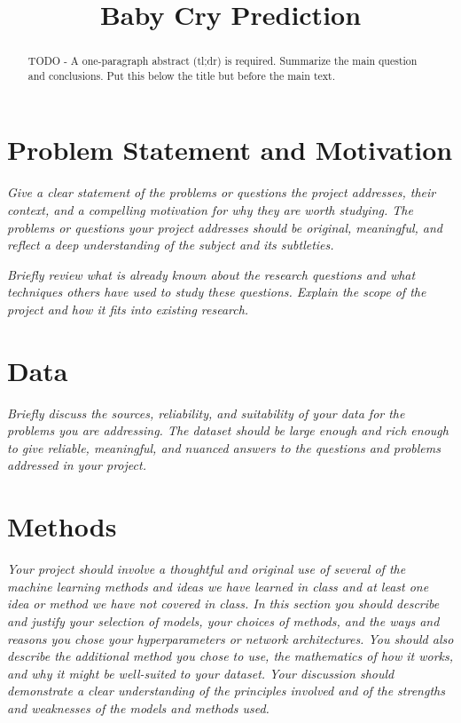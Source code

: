 \documentclass[10pt,letterpaper]{article}
\title{Baby Cry Prediction}
\begin{document}
\maketitle
\begin{abstract}
   TODO - A one-paragraph abstract (tl;dr) is required. Summarize the main question and conclusions. Put this below the title but before the main text.
\end{abstract}

\section{Problem Statement and Motivation}
\textit{Give a clear statement of the problems or questions the project addresses, their context, and a compelling motivation for why they are worth studying. The problems or questions your project addresses should be original, meaningful, and reflect a deep understanding of the subject and its subtleties.}

\textit{Briefly review what is already known about the research questions and what techniques others have used to study these questions. Explain the scope of the project and how it fits into existing research.}


\section{Data}
\textit{Briefly discuss the sources, reliability, and suitability of your data for the problems you are addressing. The dataset should be large enough and rich enough to give reliable, meaningful, and nuanced answers to the questions and problems addressed in your project.}

\section{Methods}
\textit{Your project should involve a thoughtful and original use of several of the machine learning methods and ideas we have learned in class and at least one idea or method we have not covered in class. In this section you should describe and justify your selection of models, your choices of methods, and the ways and reasons you chose your hyperparameters or network architectures. You should also describe the additional method you chose to use, the mathematics of how it works, and why it might be well-suited to your dataset. Your discussion should demonstrate a clear understanding of the principles involved and of the strengths and weaknesses of the models and methods used.}
\end{document}
